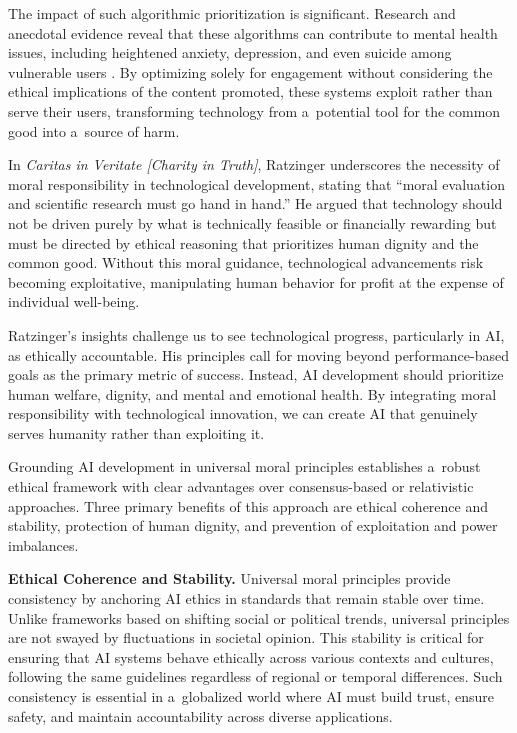 \documentclass[%
  manuscript=article,
  year=2024,
  volume=77,
  doi=10.59203/zfn.77.707,
]{zfn}
\begin{document}
The impact of such algorithmic prioritization is significant. Research and anecdotal evidence reveal that these algorithms can contribute to mental health issues, including heightened anxiety, depression, and even suicide among vulnerable users 
\parencite[][]{panoptykon_foundation_fixing_2023}. %
 By optimizing solely for engagement without considering the ethical implications of the content promoted, these systems exploit rather than serve their users, transforming technology from a~potential tool for the common good into a~source of harm.



In \textit{Caritas in Veritate [Charity in Truth]}, Ratzinger underscores the necessity of moral responsibility in technological development, stating that ``moral evaluation and scientific research must go hand in hand.'' 
\parencite[][section 31]{benedict_xvi_caritas_2009} %
 He argued that technology should not be driven purely by what is technically feasible or financially rewarding but must be directed by ethical reasoning that prioritizes human dignity and the common good. Without this moral guidance, technological advancements risk becoming exploitative, manipulating human behavior for profit at the expense of individual well-being.



Ratzinger's insights challenge us to see technological progress, particularly in AI, as ethically accountable. His principles call for moving beyond performance-based goals as the primary metric of success. Instead, AI development should prioritize human welfare, dignity, and mental and emotional health. By integrating moral responsibility with technological innovation, we can create AI that genuinely serves humanity rather than exploiting it.



Grounding AI development in universal moral principles establishes a~robust ethical framework with clear advantages over consensus-based or relativistic approaches. Three primary benefits of this approach are ethical coherence and stability, protection of human dignity, and prevention of exploitation and power imbalances.



\textbf{Ethical Coherence and Stability.} Universal moral principles provide consistency by anchoring AI ethics in standards that remain stable over time. Unlike frameworks based on shifting social or political trends, universal principles are not swayed by fluctuations in societal opinion. This stability is critical for ensuring that AI systems behave ethically across various contexts and cultures, following the same guidelines regardless of regional or temporal differences. Such consistency is essential in a~globalized world where AI must build trust, ensure safety, and maintain accountability across diverse applications.
\end{document}
